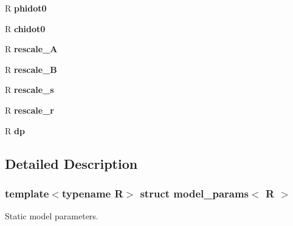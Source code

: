 \begin{DoxyCompactItemize}
\item 
\hypertarget{structmodel__params_ac9d7f464deed6f980d58be574143ccb7}{
R {\bfseries phidot0}}
\label{structmodel__params_ac9d7f464deed6f980d58be574143ccb7}

\item 
\hypertarget{structmodel__params_accce5d3473fd8647b1e4f320bcbd759e}{
R {\bfseries chidot0}}
\label{structmodel__params_accce5d3473fd8647b1e4f320bcbd759e}

\item 
\hypertarget{structmodel__params_a6e8d9931d267a4505d7c64452bfb7b83}{
R {\bfseries rescale\_\-A}}
\label{structmodel__params_a6e8d9931d267a4505d7c64452bfb7b83}

\item 
\hypertarget{structmodel__params_a509331d00495287be0a05eaa7eae1a30}{
R {\bfseries rescale\_\-B}}
\label{structmodel__params_a509331d00495287be0a05eaa7eae1a30}

\item 
\hypertarget{structmodel__params_a16cff633c0cd714e4ce91e9dbb7754b3}{
R {\bfseries rescale\_\-s}}
\label{structmodel__params_a16cff633c0cd714e4ce91e9dbb7754b3}

\item 
\hypertarget{structmodel__params_a4007a83656c74edc8916064e2f676404}{
R {\bfseries rescale\_\-r}}
\label{structmodel__params_a4007a83656c74edc8916064e2f676404}

\item 
\hypertarget{structmodel__params_a8e474ab1a14b9ee0504a88afc1a41689}{
R {\bfseries dp}}
\label{structmodel__params_a8e474ab1a14b9ee0504a88afc1a41689}

\end{DoxyCompactItemize}


\subsection{Detailed Description}
\subsubsection*{template$<$typename R$>$ struct model\_\-params$<$ R $>$}

Static model parameters. 

